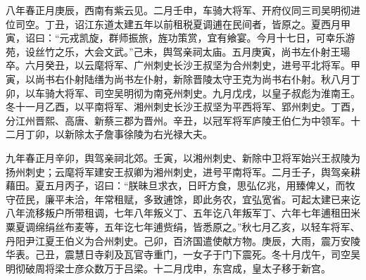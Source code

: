 \documentclass[]{article}
\begin{document}
八年春正月庚辰，西南有紫云见。二月壬申，车骑大将军、开府仪同三司吴明彻进位司空。丁丑，诏江东道太建五年以前租税夏调逋在民间者，皆原之。夏西月甲寅，诏曰：``元戎凯旋，群师振旅，旌功策赏，宜有飨宴。今月十七日，可幸乐游苑，设丝竹之乐，大会文武。''己未，舆驾亲祠太庙。五月庚寅，尚书左仆射王瑒卒。六月癸丑，以云麾将军、广州刺史长沙王叔坚为合州刺史，进号平北将军。甲寅，以尚书右仆射陆缮为尚书左仆射，新除晋陵太守王克为尚书右仆射。秋八月丁卯，以车骑大将军、司空吴明彻为南兗州刺史。九月戊戌，以皇子叔彪为淮南王。冬十一月乙酉，以平南将军、湘州刺史长沙王叔坚为平西将军、郢州刺史。丁酉，分江州晋熙、高唐、新蔡三郡为晋州。辛丑，以冠军将军庐陵王伯仁为中领军。十二月丁卯，以新除太子詹事徐陵为右光禄大夫。

九年春正月辛卯，舆驾亲祠北郊。壬寅，以湘州刺史、新除中卫将军始兴王叔陵为扬州刺史；云麾将军建安王叔卿为湘州刺史，进号平南将军。二月壬子，舆驾亲耕藉田。夏五月丙子，诏曰：``朕昧旦求衣，日旰方食，思弘亿兆，用臻俾乂，而牧守莅民，廉平未洽，年常租赋，多致逋馀，即此务农，宜弘宽省。可起太建已来讫八年流移叛户所带租调，七年八年叛义丁、五年讫八年叛军丁、六年七年逋租田米粟夏调绵绢丝布麦等，五年讫七年逋赀绢，皆悉原之。''秋七月乙亥，以轻车将军、丹阳尹江夏王伯义为合州刺史。己卯，百济国遣使献方物。庚辰，大雨，震万安陵华表。己丑，震慧日寺刹及瓦官寺重门，一女子于门下震死。冬十月戊午，司空吴明彻破周将梁士彦众数万于吕梁。十二月戊申，东宫成，皇太子移于新宫。
\end{document}
